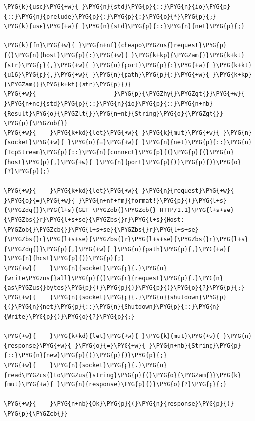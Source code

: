 \begin{Verbatim}[commandchars=\\\{\},breaklines=true,breakanywhere=true,fontsize=\codefont,xleftmargin=17bp]
\PYG{k}{use}\PYG{+w}{ }\PYG{n}{std}\PYG{p}{::}\PYG{n}{io}\PYG{p}{::}\PYG{n}{prelude}\PYG{p}{:}\PYG{p}{:}\PYG{o}{*}\PYG{p}{;}
\PYG{k}{use}\PYG{+w}{ }\PYG{n}{std}\PYG{p}{::}\PYG{n}{net}\PYG{p}{;}

\PYG{k}{fn}\PYG{+w}{ }\PYG{n+nf}{cheapo\PYGZus{}request}\PYG{p}{(}\PYG{n}{host}\PYG{p}{:}\PYG{+w}{ }\PYG{k+kp}{\PYGZam{}}\PYG{k+kt}{str}\PYG{p}{,}\PYG{+w}{ }\PYG{n}{port}\PYG{p}{:}\PYG{+w}{ }\PYG{k+kt}{u16}\PYG{p}{,}\PYG{+w}{ }\PYG{n}{path}\PYG{p}{:}\PYG{+w}{ }\PYG{k+kp}{\PYGZam{}}\PYG{k+kt}{str}\PYG{p}{)}
\PYG{+w}{                      }\PYG{p}{\PYGZhy{}\PYGZgt{}}\PYG{+w}{ }\PYG{n+nc}{std}\PYG{p}{::}\PYG{n}{io}\PYG{p}{::}\PYG{n+nb}{Result}\PYG{o}{\PYGZlt{}}\PYG{n+nb}{String}\PYG{o}{\PYGZgt{}}
\PYG{p}{\PYGZob{}}
\PYG{+w}{    }\PYG{k+kd}{let}\PYG{+w}{ }\PYG{k}{mut}\PYG{+w}{ }\PYG{n}{socket}\PYG{+w}{ }\PYG{o}{=}\PYG{+w}{ }\PYG{n}{net}\PYG{p}{::}\PYG{n}{TcpStream}\PYG{p}{::}\PYG{n}{connect}\PYG{p}{(}\PYG{p}{(}\PYG{n}{host}\PYG{p}{,}\PYG{+w}{ }\PYG{n}{port}\PYG{p}{)}\PYG{p}{)}\PYG{o}{?}\PYG{p}{;}

\PYG{+w}{    }\PYG{k+kd}{let}\PYG{+w}{ }\PYG{n}{request}\PYG{+w}{ }\PYG{o}{=}\PYG{+w}{ }\PYG{n+nf+fm}{format!}\PYG{p}{(}\PYG{l+s}{\PYGZdq{}}\PYG{l+s}{GET \PYGZob{}\PYGZcb{} HTTP/1.1}\PYG{l+s+se}{\PYGZbs{}r}\PYG{l+s+se}{\PYGZbs{}n}\PYG{l+s}{Host: \PYGZob{}\PYGZcb{}}\PYG{l+s+se}{\PYGZbs{}r}\PYG{l+s+se}{\PYGZbs{}n}\PYG{l+s+se}{\PYGZbs{}r}\PYG{l+s+se}{\PYGZbs{}n}\PYG{l+s}{\PYGZdq{}}\PYG{p}{,}\PYG{+w}{ }\PYG{n}{path}\PYG{p}{,}\PYG{+w}{ }\PYG{n}{host}\PYG{p}{)}\PYG{p}{;}
\PYG{+w}{    }\PYG{n}{socket}\PYG{p}{.}\PYG{n}{write\PYGZus{}all}\PYG{p}{(}\PYG{n}{request}\PYG{p}{.}\PYG{n}{as\PYGZus{}bytes}\PYG{p}{(}\PYG{p}{)}\PYG{p}{)}\PYG{o}{?}\PYG{p}{;}
\PYG{+w}{    }\PYG{n}{socket}\PYG{p}{.}\PYG{n}{shutdown}\PYG{p}{(}\PYG{n}{net}\PYG{p}{::}\PYG{n}{Shutdown}\PYG{p}{::}\PYG{n}{Write}\PYG{p}{)}\PYG{o}{?}\PYG{p}{;}

\PYG{+w}{    }\PYG{k+kd}{let}\PYG{+w}{ }\PYG{k}{mut}\PYG{+w}{ }\PYG{n}{response}\PYG{+w}{ }\PYG{o}{=}\PYG{+w}{ }\PYG{n+nb}{String}\PYG{p}{::}\PYG{n}{new}\PYG{p}{(}\PYG{p}{)}\PYG{p}{;}
\PYG{+w}{    }\PYG{n}{socket}\PYG{p}{.}\PYG{n}{read\PYGZus{}to\PYGZus{}string}\PYG{p}{(}\PYG{o}{\PYGZam{}}\PYG{k}{mut}\PYG{+w}{ }\PYG{n}{response}\PYG{p}{)}\PYG{o}{?}\PYG{p}{;}

\PYG{+w}{    }\PYG{n+nb}{Ok}\PYG{p}{(}\PYG{n}{response}\PYG{p}{)}
\PYG{p}{\PYGZcb{}}
\end{Verbatim}

